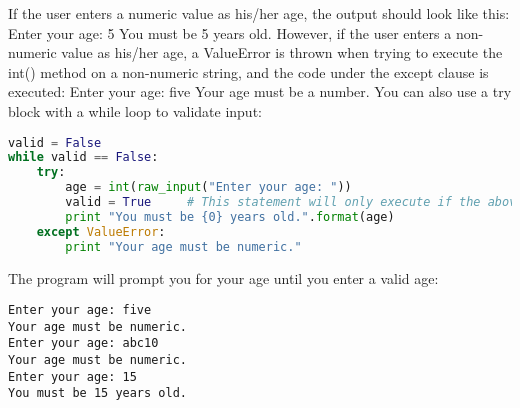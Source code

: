 If the user enters a numeric value as his/her age, the output should look like
this: Enter your age: 5 You must be 5 years old.  However, if the user enters a
non-numeric value as his/her age, a ValueError is thrown when trying to execute
the int() method on a non-numeric string, and the code under the except clause
is executed: Enter your age: five Your age must be a number.  You can also use a
try block with a while loop to validate input:
\lstset{basicstyle=\scriptsize, numbers=left, captionpos=b, tabsize=4}
\begin{lstlisting}[caption=expect type 2,language={Python},
xleftmargin=15pt, label=lst:expecttype2]
valid = False
while valid == False:
    try:
        age = int(raw_input("Enter your age: "))
        valid = True     # This statement will only execute if the above statement executes without error.
        print "You must be {0} years old.".format(age)
    except ValueError:
        print "Your age must be numeric."
\end{lstlisting}
The program will prompt you for your age until you enter a valid age:
\scriptsize
\begin{verbatim}
Enter your age: five
Your age must be numeric.
Enter your age: abc10
Your age must be numeric.
Enter your age: 15
You must be 15 years old.
\end{verbatim}
\normalsize
